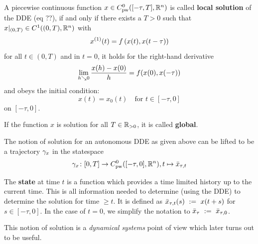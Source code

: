 \begin{definition}
    \label{def:solution-dde}

    A piecewise continuous function $x\in \Cnpw[0]{[-\tau,T]}{\R^n}$ is called \textbf{local solution} of the DDE (eq ??), if and only if there exists a $T>0$ such that $\restrict{x}{(0,T)}\in \continuouss[1]{(0,T)}{\R^n}$ with
    \begin{equation}
        \D{x}(t) = f\left(x(t),x(t-\tau)\right)
    \end{equation}
    for all $t\in (0,T)$ and in $t=0$, it holds for the right-hand derivative \begin{equation}
        \lim_{h\downto 0}\frac{x(h)-x(0)}{h}=f(x(0),x(-\tau))
    \end{equation}
    and obeys the initial condition:
    \begin{equation}
        x(t) = x_0(t) \quad\text{for } t\in [-\tau,0]
    \end{equation}
    on $[-\tau,0]$.



    If the function $x$ is solution for all $T\in\R_{>0}$, it is called \textbf{global}.

\end{definition}

The notion of solution for an autonomous DDE as given above can be lifted to be a trajectory $\trajectory[x]$ in the statespace
\begin{equation}
    \trajectory[x] \from [0,T] \to \statespace[\tau],\\
    t \mapsto \xbartaut{t}
\end{equation}

The \textbf{state} at time $t$ is a function which provides a time limited history up to the current time. This is all information needed to determine (using the DDE) to determine the solution for time $\geq t$. It is defined as $\xbartaut{t}(s)\defeq x(t+s)$ for $s\in [-\tau,0]$. In the case of $t=0$, we simplify the notation to $\xbartau \defeq \xbartaut{0}$.

This notion of solution is a \emph{dynamical systems} point of view which later turns out to be useful.


